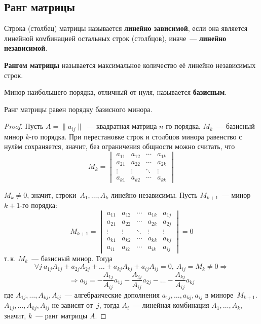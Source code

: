 \subsection{Ранг матрицы}
Строка (столбец) матрицы называется \textbf{линейно зависимой}, если она является линейной комбинацией остальных строк (столбцов), иначе~--- \textbf{линейно независимой}.

 \textbf{Рангом матрицы} называется максимальное количество её линейно независимых строк.

 Минор наибольшего порядка, отличный от нуля, называется \textbf{базисным}.

\begin{theorem}
Ранг матрицы равен порядку базисного минора.
\end{theorem}
\begin{proof}
Пусть $A = \|a_{ij}\|$~--- квадратная матрица $n$-го порядка, $M_k$~--- базисный минор $k$\nobreakdash-го порядка.
При перестановке строк и столбцов минора равенство с нулём сохраняется, значит, без ограничения общности можно считать, что
\begin{equation*}
M_k =
\begin{vmatrix}
a_{11} & a_{12} & \cdots & a_{1k} \\
a_{21} & a_{22} & \cdots & a_{2k} \\
\vdots & \vdots & \ddots & \vdots \\
a_{k1} & a_{k2} & \cdots & a_{kk}
\end{vmatrix}
\end{equation*}

$M_k \neq 0$, значит, строки~$A_1, \ldots, A_k$ линейно независимы. Пусть $M_{k+1}$~--- минор $k + 1$\nobreakdash-го порядка:
\begin{equation*}
M_{k+1} =
\begin{vmatrix}
a_{11} & a_{12} & \cdots & a_{1k} & a_{1j} \\
a_{21} & a_{22} & \cdots & a_{2k} & a_{2j} \\
\vdots & \vdots & \ddots & \vdots & \vdots \\
a_{k1} & a_{k2} & \cdots & a_{kk} & a_{kj} \\
a_{i1} & a_{i2} & \cdots & a_{ik} & a_{ij}
\end{vmatrix} = 0
\end{equation*}
т.\,к. $M_k$~--- базисный минор.
Тогда
\begin{equation*}
\forall j \ a_{1j} A_{1j} + a_{2j} A_{2j} + \ldots + a_{kj} A_{kj} + a_{ij} A_{ij} = 0, \ A_{ij} = M_k \neq 0 \Rightarrow
\end{equation*}
\begin{equation*}
\Rightarrow a_{ij} = -\frac{A_{1j}}{A_{ij}} a_{1j} - \frac{A_{2j}}{A_{ij}} a_{2j} - \ldots - \frac{A_{kj}}{A_{ij}} a_{kj}
\end{equation*}
где $A_{1j}, \ldots, A_{kj}, A_{ij}$~--- алгебраические дополнения $a_{1j}, \ldots, a_{kj}, a_{ij}$ в миноре~$M_{k+1}$.
$A_{1j}, \ldots, A_{kj}, A_{ij}$ не зависят от~$j$, тогда $A_i$~--- линейная комбинация $A_1, \ldots, A_k$, значит, $k$~--- ранг матрицы $A$.
\end{proof}

